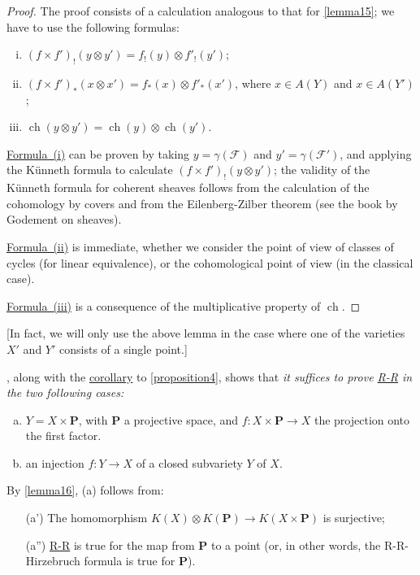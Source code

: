 \documentclass{article}
\theoremstyle{plain}
\theoremstyle{definition}
\newcommand{\sh}{\mathscr}
\newcommand{\PP}{\mathbf{P}}
\DeclareMathOperator{\ch}{ch}
\newcommand{\oldpage}[1]{\marginpar{\footnotesize$\Big\vert$ \textit{p.~#1}}}
\begin{document}
\begin{proof}
  The proof consists of a calculation analogous to that for \cref{lemma15};
  we have to use the following formulas:
  \begin{enumerate}[(i)]
    \item $(f\times f')_!(y\otimes y') = f_!(y)\otimes f'_!(y')$;
      \label{lemma16equation1}
    \item $(f\times f')_*(x\otimes x') = f_*(x)\otimes f'_*(x')$, where $x\in A(Y)$ and $x\in A(Y')$;
      \label{lemma16equation2}
    \item $\ch(y\otimes y') = \ch(y)\otimes\ch(y')$.
      \label{lemma16equation3}
  \end{enumerate}

  \hyperref[lemma16equation1]{Formula~(i)} can be proven by taking $y=\gamma(\sh{F})$ and $y'=\gamma(\sh{F}')$, and applying the K\"{u}nneth formula to calculate $(f\times f')_!(y\otimes y')$;
  the validity of the K\"{u}nneth formula for coherent sheaves follows from the calculation of the cohomology by covers and from the Eilenberg-Zilber theorem (see the book by Godement on sheaves).

  \hyperref[lemma16equation2]{Formula~(ii)} is immediate, whether we consider the point of view of classes of cycles (for linear equivalence), or the cohomological point of view (in the classical case).

  \oldpage{115}
  \hyperref[lemma16equation3]{Formula~(iii)} is a consequence of the multiplicative property of $\ch$.
\end{proof}

[In fact, we will only use the above lemma in the case where one of the varieties $X'$ and $Y'$ consists of a single point.]

, along with the \hyperref[corollary5]{corollary} to \cref{proposition4}, shows that \emph{it suffices to prove \hyperref[theoremriemannroch]{R-R} in the two following cases:}
\begin{enumerate}[(a)]
  \item $Y=X\times\PP$, with $\PP$ a projective space, and $f\colon X\times\PP\to X$ the projection onto the first factor.
  \item an injection $f\colon Y\to X$ of a closed subvariety $Y$ of $X$.
\end{enumerate}

By \cref{lemma16}, (a) follows from:
\begin{enumerate}
  \item[\rm{(a')}] The homomorphism $K(X)\otimes K(\PP)\to K(X\times\PP)$ is surjective;
  \item[\rm{(a'')}] \hyperref[theoremriemannroch]{R-R} is true for the map from $\PP$ to a point (or, in other words, the R-R-Hirzebruch formula is true for $\PP$).
\end{enumerate}
\end{document}
